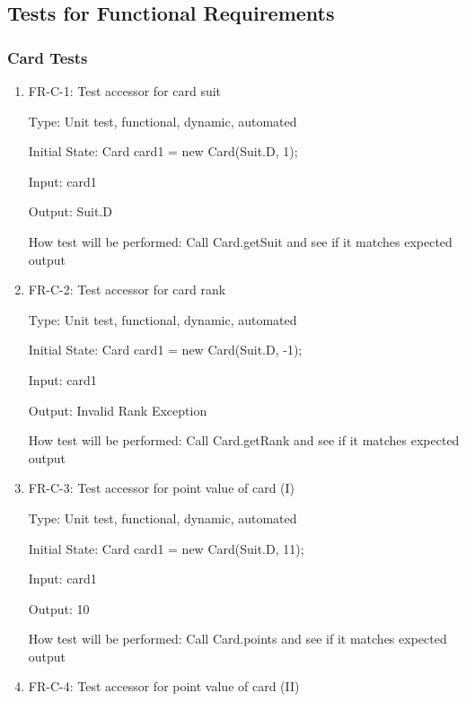 \documentclass[12pt, titlepage]{article}
\begin{document}
\subsection{Tests for Functional Requirements}
		
\subsubsection{Card Tests}
\begin{enumerate}

    \item{FR-C-1: Test accessor for card suit\\}
    
    Type: Unit test, functional, dynamic, automated
    					
    Initial State: Card card1 = new Card(Suit.D, 1);
    					
    Input: card1
    					
    Output: Suit.D
    					
    How test will be performed: Call Card.getSuit and see if it matches expected output
    
    \item{FR-C-2: Test accessor for card rank\\}
    
    Type: Unit test, functional, dynamic, automated
    					
    Initial State: Card card1 = new Card(Suit.D, -1);
    					
    Input: card1
    					
    Output: Invalid Rank Exception
    					
    How test will be performed: Call Card.getRank and see if it matches expected output
    
    \item{FR-C-3: Test accessor for point value of card (I)\\}
    
    Type: Unit test, functional, dynamic, automated
    					
    Initial State: Card card1 = new Card(Suit.D, 11);
    					
    Input: card1
    					
    Output: 10
    					
    How test will be performed: Call Card.points and see if it matches expected output
    
    \item{FR-C-4: Test accessor for point value of card (II)\\}
    

\end{enumerate}
\end{document}
